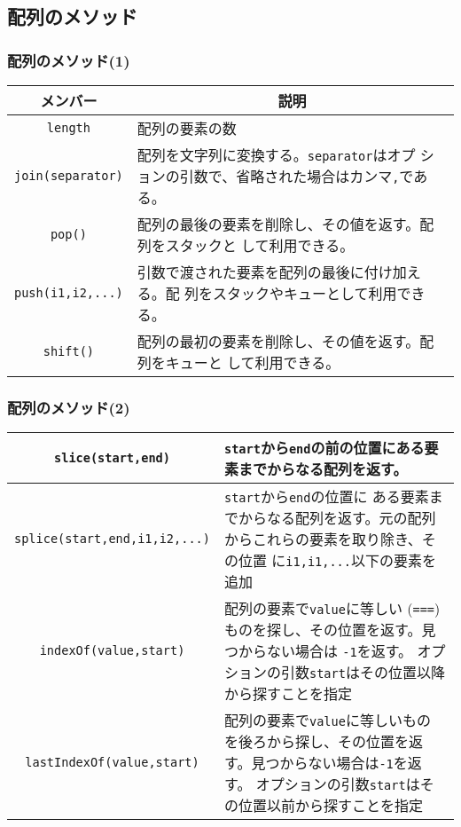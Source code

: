 \subsection{配列のメソッド}
\begin{frame}[containsverbatim]
 \frametitle{配列のメソッド(1)}
\begin{center}
 \begin{tabular}{|c|m{}|}\hline
 メンバー&\multicolumn{1}{c|}{説明} \\\hline
  \Verb+length+ &配列の要素の数\\ \hline
  \Verb+join(separator)+& 配列を文字列に変換する。\Verb+separator+はオプ
      ションの引数で、省略された場合はカンマ\Verb+,+である。\\ \hline
  \Verb+pop()+& 配列の最後の要素を削除し、その値を返す。配列をスタックと
      して利用できる。\\ \hline
  \Verb+push(i1,i2,...)+& 引数で渡された要素を配列の最後に付け加える。配
      列をスタックやキューとして利用できる。\\ \hline
  \Verb+shift()+&配列の最初の要素を削除し、その値を返す。配列をキューと
      して利用できる。\\ \hline
\end{tabular}
\end{center}
\end{frame}
\begin{frame}[containsverbatim]
 \frametitle{配列のメソッド(2)}
\hspace*{-2zw}
 \begin{tabular}{|c|m{}|}\hline
   \Verb+slice(start,end)+&\Verb+start+から\Verb+end+の前の位置にある要
  素までからなる配列を返す。%
  \\ \hline
  \Verb+splice(start,end,i1,i2,...)+&\Verb+start+から\Verb+end+の位置に
      ある要素までからなる配列を返す。元の配列からこれらの要素を取り除き、その位置
      に\Verb+i1,i1,...+以下の要素を追加\\ \hline
  \Verb+indexOf(value,start)+&配列の要素で\texttt{value}に等しい
      (\texttt{===})ものを探し、その位置を返す。見つからない場合は
      \texttt{-1}を返す。
      オプションの引数\texttt{start}はその位置以降から探すことを指定
      \\ \hline
  \Verb+lastIndexOf(value,start)+&配列の要素で\texttt{value}に等しいもの
      を後ろから探し、その位置を返す。見つからない場合は\texttt{-1}を返す。
      オプションの引数\texttt{start}はその位置以前から探すことを指定
      \\ \hline
\end{tabular}
\end{frame}
